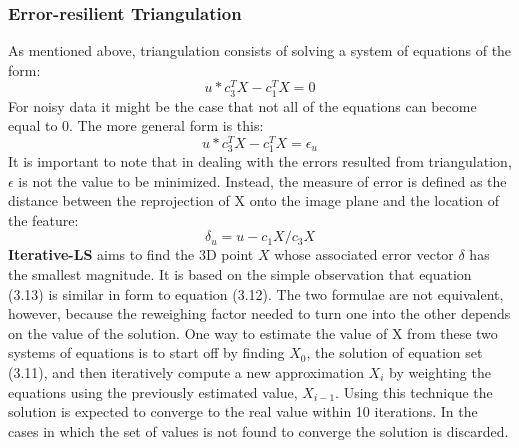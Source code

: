 \documentclass[12pt,a4paper,twoside,openright]{report}
\begin{document}
\subsubsection{Error-resilient Triangulation}
As mentioned above, triangulation consists of solving a system of equations of the form:\\
\begin{equation}
u * {c}_{3}^TX - {c}_{1}^TX=0
\end{equation}
For noisy data it might be the case that not all of the equations can become equal to 0. The more general form is this:
\begin{equation}
u * {c}_{3}^TX - {c}_{1}^TX=\epsilon_u
\end{equation}
It is important to note that in dealing with the errors resulted from triangulation, $\epsilon$ is not the value to be minimized. Instead, the measure of error is defined as the distance between the reprojection of X onto the image plane and the location of the feature: 
\begin{equation}
\delta_u = u - c_1X/c_3X
\end{equation}
\textbf{Iterative-LS}\cite[p.~9]{Hartley96triangulation} aims to  find the 3D point $X$ whose associated error vector $\delta$ has the smallest magnitude. It is based on the simple observation that equation (3.13) is similar in form to equation (3.12). The two formulae are not equivalent, however, because the reweighing factor needed to turn one into the other depends on the value of the solution. One way to estimate the value of X from these two systems of equations is to start off by finding $X_0$, the solution of equation set (3.11), and then iteratively compute a new approximation $X_i$  by weighting the equations using the previously estimated value, $X_{i-1}$. Using this technique the solution is expected to converge to the real value within 10 iterations. In the cases in which the set of values is not found to converge the solution is discarded.

 
\end{document}
